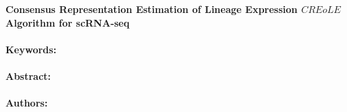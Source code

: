 \noindent
\large {\bf Consensus Representation Estimation of Lineage Expression \(CREoLE\) Algorithm for scRNA-seq} 


\normalsize 


\noindent \paragraph{Keywords:} 

\noindent \paragraph{Abstract:} 



\noindent \paragraph{Authors:} 


